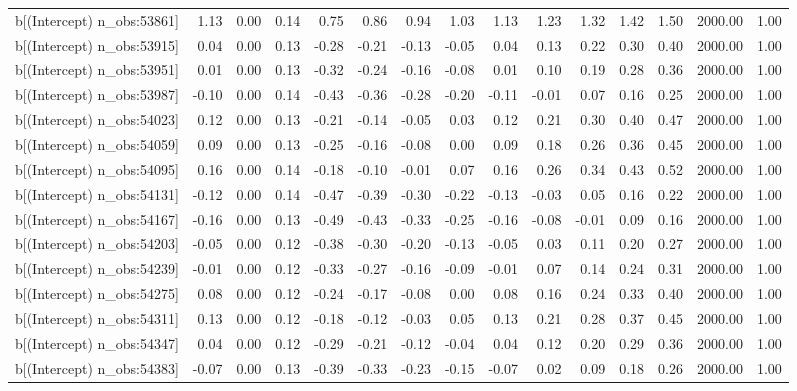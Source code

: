 \begin{table}[ht]
\begin{tabular}{rrrrrrrrrrrrrrr}
  b[(Intercept) n\_obs:53861] & 1.13 & 0.00 & 0.14 & 0.75 & 0.86 & 0.94 & 1.03 & 1.13 & 1.23 & 1.32 & 1.42 & 1.50 & 2000.00 & 1.00 \\ 
  b[(Intercept) n\_obs:53915] & 0.04 & 0.00 & 0.13 & -0.28 & -0.21 & -0.13 & -0.05 & 0.04 & 0.13 & 0.22 & 0.30 & 0.40 & 2000.00 & 1.00 \\ 
  b[(Intercept) n\_obs:53951] & 0.01 & 0.00 & 0.13 & -0.32 & -0.24 & -0.16 & -0.08 & 0.01 & 0.10 & 0.19 & 0.28 & 0.36 & 2000.00 & 1.00 \\ 
  b[(Intercept) n\_obs:53987] & -0.10 & 0.00 & 0.14 & -0.43 & -0.36 & -0.28 & -0.20 & -0.11 & -0.01 & 0.07 & 0.16 & 0.25 & 2000.00 & 1.00 \\ 
  b[(Intercept) n\_obs:54023] & 0.12 & 0.00 & 0.13 & -0.21 & -0.14 & -0.05 & 0.03 & 0.12 & 0.21 & 0.30 & 0.40 & 0.47 & 2000.00 & 1.00 \\ 
  b[(Intercept) n\_obs:54059] & 0.09 & 0.00 & 0.13 & -0.25 & -0.16 & -0.08 & 0.00 & 0.09 & 0.18 & 0.26 & 0.36 & 0.45 & 2000.00 & 1.00 \\ 
  b[(Intercept) n\_obs:54095] & 0.16 & 0.00 & 0.14 & -0.18 & -0.10 & -0.01 & 0.07 & 0.16 & 0.26 & 0.34 & 0.43 & 0.52 & 2000.00 & 1.00 \\ 
  b[(Intercept) n\_obs:54131] & -0.12 & 0.00 & 0.14 & -0.47 & -0.39 & -0.30 & -0.22 & -0.13 & -0.03 & 0.05 & 0.16 & 0.22 & 2000.00 & 1.00 \\ 
  b[(Intercept) n\_obs:54167] & -0.16 & 0.00 & 0.13 & -0.49 & -0.43 & -0.33 & -0.25 & -0.16 & -0.08 & -0.01 & 0.09 & 0.16 & 2000.00 & 1.00 \\ 
  b[(Intercept) n\_obs:54203] & -0.05 & 0.00 & 0.12 & -0.38 & -0.30 & -0.20 & -0.13 & -0.05 & 0.03 & 0.11 & 0.20 & 0.27 & 2000.00 & 1.00 \\ 
  b[(Intercept) n\_obs:54239] & -0.01 & 0.00 & 0.12 & -0.33 & -0.27 & -0.16 & -0.09 & -0.01 & 0.07 & 0.14 & 0.24 & 0.31 & 2000.00 & 1.00 \\ 
  b[(Intercept) n\_obs:54275] & 0.08 & 0.00 & 0.12 & -0.24 & -0.17 & -0.08 & 0.00 & 0.08 & 0.16 & 0.24 & 0.33 & 0.40 & 2000.00 & 1.00 \\ 
  b[(Intercept) n\_obs:54311] & 0.13 & 0.00 & 0.12 & -0.18 & -0.12 & -0.03 & 0.05 & 0.13 & 0.21 & 0.28 & 0.37 & 0.45 & 2000.00 & 1.00 \\ 
  b[(Intercept) n\_obs:54347] & 0.04 & 0.00 & 0.12 & -0.29 & -0.21 & -0.12 & -0.04 & 0.04 & 0.12 & 0.20 & 0.29 & 0.36 & 2000.00 & 1.00 \\ 
  b[(Intercept) n\_obs:54383] & -0.07 & 0.00 & 0.13 & -0.39 & -0.33 & -0.23 & -0.15 & -0.07 & 0.02 & 0.09 & 0.18 & 0.26 & 2000.00 & 1.00 \\ 

\end{tabular}
\end{table}
